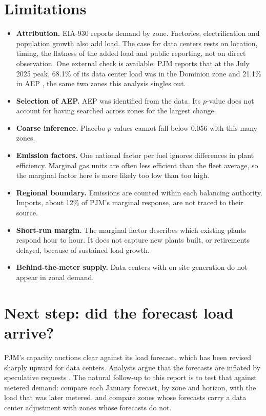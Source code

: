 \documentclass[11pt,a4paper]{article}
\begin{document}
\section{Limitations}\label{sec:limits}
\begin{itemize}
\item \textbf{Attribution.} EIA-930 reports demand by zone. Factories, electrification and population growth also add load. The case for data centers rests on location, timing, the flatness of the added load and public reporting, not on direct observation. One external check is available: PJM reports that at the July 2025 peak, 68.1\% of its data center load was in the Dominion zone and 21.1\% in AEP \cite{pjmaccuracy}, the same two zones this analysis singles out.
\item \textbf{Selection of AEP.} AEP was identified from the data. Its $p$-value does not account for having searched across zones for the largest change.
\item \textbf{Coarse inference.} Placebo $p$-values cannot fall below 0.056 with this many zones.
\item \textbf{Emission factors.} One national factor per fuel ignores differences in plant efficiency. Marginal gas units are often less efficient than the fleet average, so the marginal factor here is more likely too low than too high.
\item \textbf{Regional boundary.} Emissions are counted within each balancing authority. Imports, about 12\% of PJM's marginal response, are not traced to their source.
\item \textbf{Short-run margin.} The marginal factor describes which existing plants respond hour to hour. It does not capture new plants built, or retirements delayed, because of sustained load growth.
\item \textbf{Behind-the-meter supply.} Data centers with on-site generation do not appear in zonal demand.
\end{itemize}

\section{Next step: did the forecast load arrive?}\label{sec:next}
PJM's capacity auctions clear against its load forecast, which has been revised sharply upward for data centers. Analysts argue that the forecasts are inflated by speculative requests \cite{gridstrategies}. The natural follow-up to this report is to test that against metered demand: compare each January forecast, by zone and horizon, with the load that was later metered, and compare zones whose forecasts carry a data center adjustment with zones whose forecasts do not.
\end{document}
